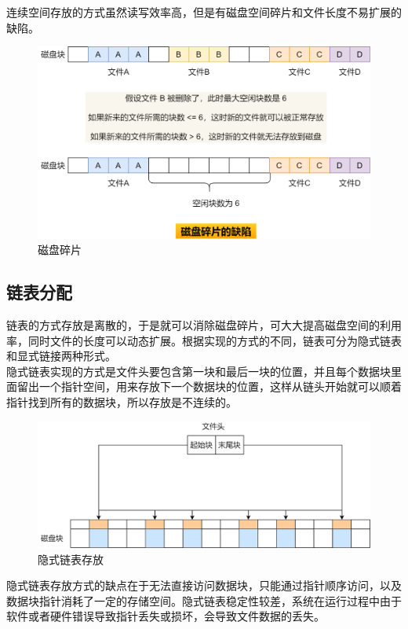 连续空间存放的方式虽然读写效率高，但是有磁盘空间碎片和文件长度不易扩展的缺陷。

\begin{figure}[H]
	\centering
	\includegraphics[scale=0.4]{img/C5/5-4/2.png}
	\caption{磁盘碎片}
\end{figure}

\subsection{链表分配}

链表的方式存放是离散的，于是就可以消除磁盘碎片，可大大提高磁盘空间的利用率，同时文件的长度可以动态扩展。根据实现的方式的不同，链表可分为隐式链表和显式链接两种形式。 \\

隐式链表实现的方式是文件头要包含第一块和最后一块的位置，并且每个数据块里面留出一个指针空间，用来存放下一个数据块的位置，这样从链头开始就可以顺着指针找到所有的数据块，所以存放是不连续的。

\begin{figure}[H]
	\centering
	\includegraphics[scale=0.35]{img/C5/5-4/3.png}
	\caption{隐式链表存放}
\end{figure}

隐式链表存放方式的缺点在于无法直接访问数据块，只能通过指针顺序访问，以及数据块指针消耗了一定的存储空间。隐式链表稳定性较差，系统在运行过程中由于软件或者硬件错误导致指针丢失或损坏，会导致文件数据的丢失。 \\

